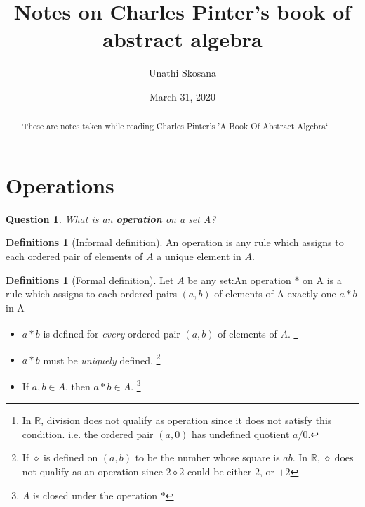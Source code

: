 \documentclass[nohyper,nobib]{tufte-handout}
\title{	
	\normalfont\normalsize 
	\huge Notes on Charles Pinter's book of abstract algebra %
}\author{Unathi Skosana} %
\date{\vspace{-5pt}\normalsize March 31, 2020} %
\newtheorem{quest}[thm]{Question}
\theoremstyle{definition}
\newtheorem{defns}[thm]{Definitions}
\theoremstyle{remark}
\begin{document}
\justifying 
\maketitle

\begin{abstract}
\noindent
These are notes taken while reading Charles Pinter's 'A Book Of Abstract Algebra`
\end{abstract}

\tableofcontents

\section{Operations}

\begin{quest}
	What is an \textbf{operation} on a set A?
\end{quest}

\begin{defns}[Informal definition]
    An operation is any rule which assigns to each ordered pair of elements of $A$ a unique element in $A$.
\end{defns}

\begin{defns}[Formal definition]
	Let $A$ be any set:\newline An operation $*$ on A is a rule which assigns to each ordered pairs $(a,b)$ of elements of A exactly one $a * b$ in A
    \begin{itemize}
        \item $a * b$ is defined for \emph{every} ordered pair $(a,b)$ of elements of $A$. \footnote{In $\mathbb{R}$, division does not qualify as operation since it does not satisfy this condition. i.e. the ordered pair $(a, 0)$ has undefined quotient $a / 0$.}
        \item $a * b$ must be \emph{uniquely} defined. \footnote{If $\diamond$ is defined on $(a, b)$ to be the number whose square is $ab$. In $\mathbb{R}$, $\diamond$ does not qualify as an operation since $2 \diamond 2$  could be either $2$, or $+2$}
        \item If $a, b \in A$, then $a * b \in A$. \footnote{$A$ is closed under the operation $*$}
    \end{itemize}
\end{defns}
\end{document}
